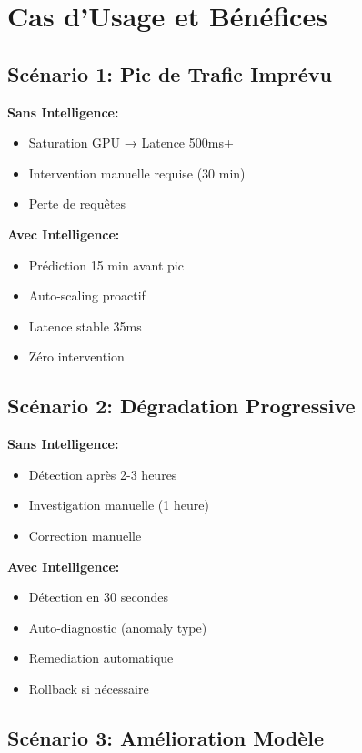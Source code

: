 \documentclass[12pt,a4paper]{article}
\begin{document}
\section{Cas d'Usage et Bénéfices}

\subsection{Scénario 1: Pic de Trafic Imprévu}

\textbf{Sans Intelligence:}
\begin{itemize}
    \item Saturation GPU → Latence 500ms+
    \item Intervention manuelle requise (30 min)
    \item Perte de requêtes
\end{itemize}

\textbf{Avec Intelligence:}
\begin{itemize}
    \item Prédiction 15 min avant pic
    \item Auto-scaling proactif
    \item Latence stable 35ms
    \item Zéro intervention
\end{itemize}

\subsection{Scénario 2: Dégradation Progressive}

\textbf{Sans Intelligence:}
\begin{itemize}
    \item Détection après 2-3 heures
    \item Investigation manuelle (1 heure)
    \item Correction manuelle
\end{itemize}

\textbf{Avec Intelligence:}
\begin{itemize}
    \item Détection en 30 secondes
    \item Auto-diagnostic (anomaly type)
    \item Remediation automatique
    \item Rollback si nécessaire
\end{itemize}

\subsection{Scénario 3: Amélioration Modèle}
\end{document}
